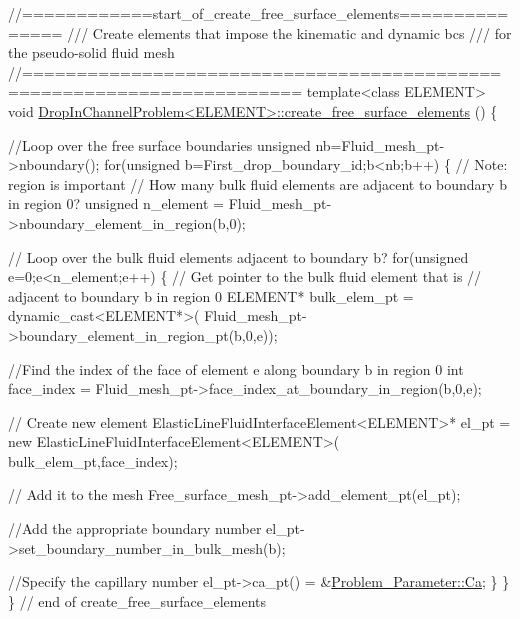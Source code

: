  
\begin{DoxyCodeInclude}
\textcolor{comment}{//============start\_of\_create\_free\_surface\_elements===============}
\textcolor{comment}{/// Create elements that impose the kinematic and dynamic bcs}
\textcolor{comment}{}\textcolor{comment}{/// for the pseudo-solid fluid mesh}
\textcolor{comment}{}\textcolor{comment}{//=======================================================================}
\textcolor{keyword}{template}<\textcolor{keyword}{class} ELEMENT>
\textcolor{keywordtype}{void} \hyperlink{classDropInChannelProblem_a73b989e3bedbd3630f576b0dba0f724f}{DropInChannelProblem<ELEMENT>::create\_free\_surface\_elements}
      ()
\{ 

 \textcolor{comment}{//Loop over the free surface boundaries}
 \textcolor{keywordtype}{unsigned} nb=Fluid\_mesh\_pt->nboundary();
 \textcolor{keywordflow}{for}(\textcolor{keywordtype}{unsigned} b=First\_drop\_boundary\_id;b<nb;b++)
  \{
   \textcolor{comment}{// Note: region is important}
   \textcolor{comment}{// How many bulk fluid elements are adjacent to boundary b in region 0?}
   \textcolor{keywordtype}{unsigned} n\_element = Fluid\_mesh\_pt->nboundary\_element\_in\_region(b,0);
   
   \textcolor{comment}{// Loop over the bulk fluid elements adjacent to boundary b?}
   \textcolor{keywordflow}{for}(\textcolor{keywordtype}{unsigned} e=0;e<n\_element;e++)
    \{
     \textcolor{comment}{// Get pointer to the bulk fluid element that is }
     \textcolor{comment}{// adjacent to boundary b in region 0}
     ELEMENT* bulk\_elem\_pt = \textcolor{keyword}{dynamic\_cast<}ELEMENT*\textcolor{keyword}{>}(
      Fluid\_mesh\_pt->boundary\_element\_in\_region\_pt(b,0,e));
     
     \textcolor{comment}{//Find the index of the face of element e along boundary b in region 0}
     \textcolor{keywordtype}{int} face\_index = Fluid\_mesh\_pt->face\_index\_at\_boundary\_in\_region(b,0,e);
     
     \textcolor{comment}{// Create new element}
     ElasticLineFluidInterfaceElement<ELEMENT>* el\_pt =
      \textcolor{keyword}{new} ElasticLineFluidInterfaceElement<ELEMENT>(
       bulk\_elem\_pt,face\_index);   
     
     \textcolor{comment}{// Add it to the mesh}
     Free\_surface\_mesh\_pt->add\_element\_pt(el\_pt);
     
     \textcolor{comment}{//Add the appropriate boundary number}
     el\_pt->set\_boundary\_number\_in\_bulk\_mesh(b);
     
     \textcolor{comment}{//Specify the capillary number}
     el\_pt->ca\_pt() = &\hyperlink{namespaceProblem__Parameter_af6194d2571881779c678fbabc1503d47}{Problem\_Parameter::Ca};
    \}
  \}
\}
\textcolor{comment}{// end of create\_free\_surface\_elements}

\end{DoxyCodeInclude}


